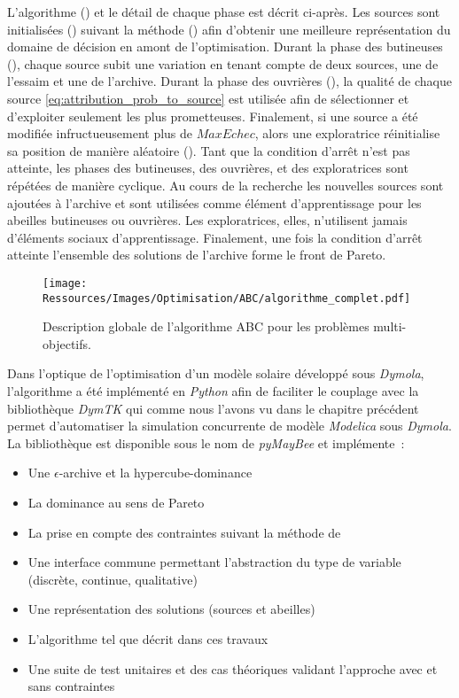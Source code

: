 L’algorithme () et le détail de chaque phase est décrit ci-après.
Les sources sont initialisées () suivant la méthode
 () afin d’obtenir une meilleure représentation du
domaine de décision en amont de l’optimisation.
Durant la phase des butineuses (), chaque source
subit une variation en tenant compte de deux sources, une de l’essaim et une de l’archive.
Durant la phase des ouvrières (), la qualité de
chaque source \eqref{eq:attribution_prob_to_source} est utilisée afin de sélectionner
et d’exploiter seulement les plus prometteuses. Finalement, si une source a été
modifiée infructueusement plus de $MaxEchec$, alors une exploratrice
réinitialise sa position de manière aléatoire  ().
Tant que la condition d’arrêt n’est pas atteinte, les phases des butineuses,
des ouvrières, et des exploratrices sont répétées de manière cyclique. Au cours de
la recherche les nouvelles sources sont ajoutées à l’archive et sont utilisées
comme élément d’apprentissage pour les abeilles butineuses ou ouvrières. Les
exploratrices, elles, n’utilisent jamais d’éléments sociaux d’apprentissage.
Finalement, une fois la condition d’arrêt atteinte l’ensemble des solutions
de l’archive forme le front de Pareto.

\begin{figure}
    \centering
    \texttt{[image: Ressources/Images/Optimisation/ABC/algorithme\_complet.pdf]}
    \caption[Description globale de l’algorithme ABC pour les problèmes multi-objectifs]
            {Description globale de l’algorithme ABC pour les problèmes multi-objectifs.}
    \label{fig:abc_complet}
\end{figure}

Dans l’optique de l’optimisation d’un modèle solaire développé sous \textit{Dymola}, l’algorithme
a été implémenté en \textit{Python} afin de faciliter le couplage avec la bibliothèque
\textit{DymTK} qui comme nous l’avons vu dans le chapitre précédent permet d’automatiser
la simulation concurrente de modèle \textit{Modelica} sous \textit{Dymola}. La bibliothèque est
disponible sous le nom de \textit{pyMayBee} et implémente~:
\begin{itemize}
  \item Une $\epsilon$-archive et la hypercube-dominance
  \item La dominance au sens de Pareto
  \item La prise en compte des contraintes suivant la méthode de \textcite{Woldesenbet20073077}
  \item Une interface commune permettant l’abstraction du type de variable (discrète, continue, qualitative)
  \item Une représentation des solutions (sources et abeilles)
  \item L’algorithme tel que décrit dans ces travaux
  \item Une suite de test unitaires et des cas théoriques validant l’approche avec
        et sans contraintes
\end{itemize}

